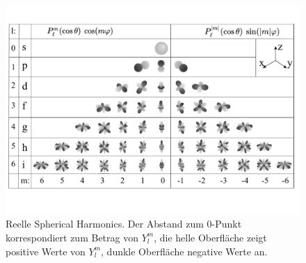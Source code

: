 \begin{figure}
	\centering
	\includegraphics[page=1,width=\textwidth]{pictures/Sphericalfunctions.pdf}
	\caption{Reelle Spherical Harmonics. Der Abstand zum 0-Punkt korrespondiert zum Betrag von $Y_l^m$, die helle Oberfläche zeigt positive Werte von $Y_l^m$, dunkle Oberfläche negative Werte an.}
\end{figure}

